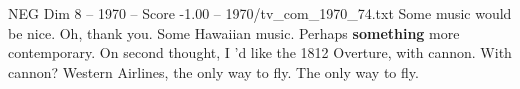 \begin{textsample}{NEG Dim 8 – 1970 – Score -1.00 – 1970/tv\_com\_1970\_74.txt}  \label{ex:f8_neg_009}
Some music would be nice.
Oh, thank you.
Some Hawaiian music.
Perhaps \textbf{something} more contemporary.
On second thought, I 'd like the 1812 Overture, with cannon.
With cannon?
Western Airlines, the only way to fly.
The only way to fly.

\end{textsample}
